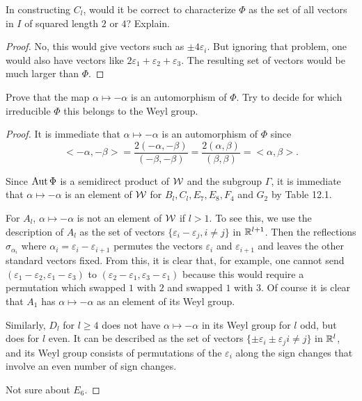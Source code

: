 \begin{ex}
  In constructing $C_l$, would it be correct to characterize $\Phi$ as the set of all vectors in $I$ of squared length $2$ or $4$? Explain.
\end{ex}
\begin{proof}
  No, this would give vectors such as $\pm4\varepsilon_i$. But ignoring that problem, one would also have vectors like $2\varepsilon_1 + \varepsilon_2 + \varepsilon_3$. The resulting set of vectors would be much larger than $\Phi$.
\end{proof}

\begin{ex}\label{12.6}
  Prove that the map $\alpha\mapsto -\alpha$ is an automorphism of $\Phi$. Try to decide for which irreducible $\Phi$ this belongs to the Weyl group.
\end{ex}
\begin{proof}
  It is immediate that $\alpha\mapsto -\alpha$ is an automorphism of $\Phi$ since
  \begin{equation*}
    <-\alpha,-\beta> = \frac{2(-\alpha,-\beta)}{(-\beta,-\beta)} = \frac{2(\alpha, \beta)}{(\beta, \beta)} = <\alpha, \beta>.
  \end{equation*}

  Since $\operatorname{Aut}\Phi$ is a semidirect product of ${\cal W}$ and the subgroup $\Gamma$, it is immediate that $\alpha\mapsto -\alpha$ is an element of ${\cal W}$ for $B_l, C_l, E_7, E_8, F_4$ and $G_2$ by Table 12.1.

  For $A_l$, $\alpha\mapsto -\alpha$ is not an element of ${\cal W}$ if $l > 1$. To see this, we use the description of $A_l$ as the set of vectors $\{\varepsilon_i -\varepsilon_j, i\neq j\}$ in ${\mathbb R}^{l+1}$. Then the reflections $\sigma_{\alpha_i}$ where $\alpha_i = \varepsilon_i - \varepsilon_{i+1}$ permutes the vectors $\varepsilon_i$ and $\varepsilon_{i+1}$ and leaves the other standard vectors fixed. From this, it is clear that, for example, one cannot send $(\varepsilon_1 - \varepsilon_2, \varepsilon_1 - \varepsilon_3)$ to $(\varepsilon_2 - \varepsilon_1, \varepsilon_3 - \varepsilon_1)$ because this would require a permutation which swapped $1$ with $2$ and swapped $1$ with $3$.
  Of course it is clear that $A_1$ has $\alpha\mapsto -\alpha$ as an element of its Weyl group.

  Similarly, $D_l$ for $l \geqslant 4$ does not have $\alpha\mapsto -\alpha$ in its Weyl group for $l$ odd, but does for $l$ even. It can be described as the set of vectors $\{\pm\varepsilon_i \pm \varepsilon_j i\neq j\}$ in ${\mathbb R}^l$, and its Weyl group consists of permutations of the $\varepsilon_i$ along the sign changes that involve an even number of sign changes.

  Not sure about $E_6$.
\end{proof}

